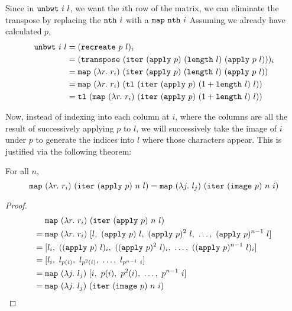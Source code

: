 \documentclass[sigplan,10pt,anonymous,review]{thesis}
\begin{document}
Since in $\texttt{\textup{unbwt}}~i~l$, we want the $i$th row of the matrix, we
can eliminate the transpose by replacing the $\texttt{\textup{nth}}~i$ with a
$\texttt{\textup{map}}~\texttt{\textup{nth}}~i$ Assuming we already have calculated $p$,
\begin{align*}
   \texttt{\textup{unbwt}}~i~l &= (\texttt{\textup{recreate}}~p~l)_i \\
  &= (\texttt{\textup{transpose}}~(\texttt{\textup{iter}}~(\texttt{\textup{apply}}~p)~(\texttt{\textup{length}}~l)~(\texttt{\textup{apply}}~p~l)))_i \\
  &= \texttt{\textup{map}}~(\lambda
  r.~r_i)~(\texttt{\textup{iter}}~(\texttt{\textup{apply}}~p)~(\texttt{\textup{length}}~l)~(\texttt{\textup{apply}}~p~l)) \\
  &= \texttt{\textup{map}}~(\lambda r.~r_i)~(\texttt{\textup{tl}}~(\texttt{\textup{iter}}~(\texttt{\textup{apply}}~p)~(1 +
  \texttt{\textup{length}}~l)~l)) \\
  &= \texttt{\textup{tl}}~(\texttt{\textup{map}}~(\lambda r.~r_i)~(\texttt{\textup{iter}}~(\texttt{\textup{apply}}~p)~(1 + \texttt{\textup{length}}~l)~l))
\end{align*}

Now, instead of indexing into each column at $i$, where the columns
are all the result of successively applying $p$ to $l$, we will
successively take the image of $i$ under $p$ to generate the indices
into $l$ where those characters appear. This is justified via the
following theorem:
\begin{theorem}
  For all $n$,
  \begin{equation*}
  \texttt{\textup{map}}~(\lambda r.~r_i)~(\texttt{\textup{iter}}~(\texttt{\textup{apply}}~p)~n~l)
  =
  \texttt{\textup{map}}~(\lambda j.~l_j)~(\texttt{\textup{iter}}~(\texttt{\textup{image}}~p)~n~i)
  \end{equation*}
\end{theorem}
\begin{proof}
  \begin{align*}
       & \texttt{\textup{map}}~(\lambda r.~r_i)~(\texttt{\textup{iter}}~(\texttt{\textup{apply}}~p)~n~l) \\
    ={}& \texttt{\textup{map}}~(\lambda r.~r_i)~[l,~(\texttt{\textup{apply}}~p)~l,~(\texttt{\textup{apply}}~p)^2~l,~\ldots,~(\texttt{\textup{apply}}~p)^{n-1}~l] \\
    ={}& [l_i,~((\texttt{\textup{apply}}~p)~l)_i,~((\texttt{\textup{apply}}~p)^2~l)_i,~\ldots,~((\texttt{\textup{apply}}~p)^{n-1}~l)_i] \\
    ={}& [l_i,~l_{p(i)},~l_{p^2(i)},~\ldots,~l_{p^{n-1}~i}] \\
    ={}& \texttt{\textup{map}}~(\lambda j.~l_j)~[i,~p(i),~p^2(i),~\ldots,~p^{n-1}~i] \\
    ={}& \texttt{\textup{map}}~(\lambda j.~l_j)~(\texttt{\textup{iter}}~(\texttt{\textup{image}}~p)~n~i) \qedhere
  \end{align*}
\end{proof}
\end{document}

